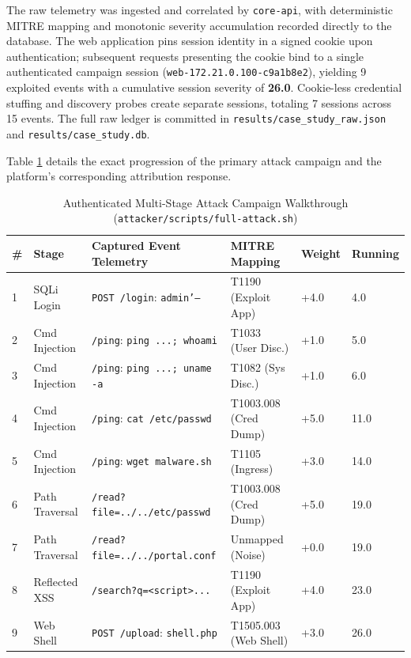\documentclass[12pt,a4paper]{report}
\begin{document}
The raw telemetry was ingested and correlated by \texttt{core-api}, with deterministic MITRE mapping and monotonic severity accumulation recorded directly to the database. The web application pins session identity in a signed cookie upon authentication; subsequent requests presenting the cookie bind to a single authenticated campaign session (\texttt{web-172.21.0.100-c9a1b8e2}), yielding 9 exploited events with a cumulative session severity of \textbf{26.0}. Cookie-less credential stuffing and discovery probes create separate sessions, totaling 7 sessions across 15 events. The full raw ledger is committed in \texttt{results/case_study_raw.json} and \texttt{results/case_study.db}.

Table \ref{tab:case_study_steps} details the exact progression of the primary attack campaign and the platform's corresponding attribution response.

\begin{table}[H]
\centering
\caption{Authenticated Multi-Stage Attack Campaign Walkthrough (\texttt{attacker/scripts/full-attack.sh})}
\label{tab:case_study_steps}
\small
\begin{tabular}{|p{0.8cm}|p{2.6cm}|p{3.8cm}|p{2.6cm}|p{1.2cm}|p{1.4cm}|}
\hline
\textbf{\#} & \textbf{Stage} & \textbf{Captured Event Telemetry} & \textbf{MITRE Mapping} & \textbf{Weight} & \textbf{Running} \\
\hline
1 & SQLi Login & \texttt{POST /login}: \texttt{admin'--} & T1190 (Exploit App) & +4.0 & 4.0 \\
\hline
2 & Cmd Injection & \texttt{/ping}: \texttt{ping ...; whoami} & T1033 (User Disc.) & +1.0 & 5.0 \\
\hline
3 & Cmd Injection & \texttt{/ping}: \texttt{ping ...; uname -a} & T1082 (Sys Disc.) & +1.0 & 6.0 \\
\hline
4 & Cmd Injection & \texttt{/ping}: \texttt{cat /etc/passwd} & T1003.008 (Cred Dump) & +5.0 & 11.0 \\
\hline
5 & Cmd Injection & \texttt{/ping}: \texttt{wget malware.sh} & T1105 (Ingress) & +3.0 & 14.0 \\
\hline
6 & Path Traversal & \texttt{/read?file=../../etc/passwd} & T1003.008 (Cred Dump) & +5.0 & 19.0 \\
\hline
7 & Path Traversal & \texttt{/read?file=../../portal.conf} & Unmapped (Noise) & +0.0 & 19.0 \\
\hline
8 & Reflected XSS & \texttt{/search?q=<script>...} & T1190 (Exploit App) & +4.0 & 23.0 \\
\hline
9 & Web Shell & \texttt{POST /upload}: \texttt{shell.php} & T1505.003 (Web Shell) & +3.0 & 26.0 \\
\hline
\end{tabular}
\end{table}
\end{document}
